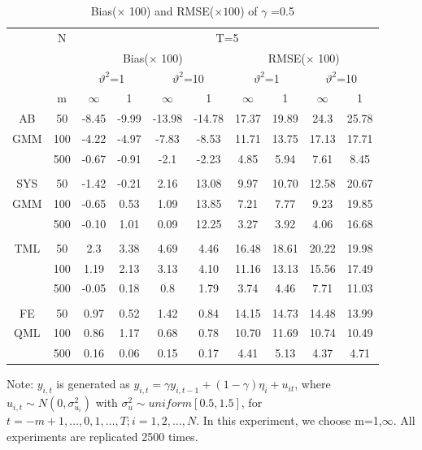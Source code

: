 \documentclass[12pt,a4paper,hyperref]{article}
\begin{document}
\begin{center}
\begin{table}[H]
\caption{Bias($\times$ 100) and RMSE($\times 100$) of $\gamma$ =0.5}  \label{table5}
\centering
\begin{tabular} {*{10}{c}}
\toprule
&N& \multicolumn{8}{c}{T=5}\\
\cmidrule(lr){3-10}
&& \multicolumn{4}{c}{Bias($\times$ 100)} & \multicolumn{4}{c}{RMSE($\times$ 100)}\\
  \cmidrule(lr){3-6} \cmidrule(lr){7-10}
&&  \multicolumn{2}{c}{$\vartheta^{2}$=1}&\multicolumn{2}{c}{$\vartheta^{2}$=10} & \multicolumn{2}{c}{$\vartheta^{2}$=1}&\multicolumn{2}{c}{$\vartheta^{2}$=10}\\
\cmidrule(lr){3-4} \cmidrule(lr){5-6}\cmidrule(lr){7-8}\cmidrule(lr){9-10}
& m & $\infty$ &1&$\infty$ &1&$\infty$ &1&$\infty$&1\\
\cmidrule(lr){3-4} \cmidrule(lr){5-6}\cmidrule(lr){7-8}\cmidrule(lr){9-10}
AB &50&-8.45&-9.99&-13.98&-14.78&17.37&19.89&	24.3&25.78\\
GMM &100&-4.22&-4.97  & -7.83& -8.53& 11.71& 13.75&17.13 &17.71 \\
&500& -0.67&-0.91&-2.1&-2.23&4.85&5.94	&7.61&8.45 \\
\midrule \\
\cmidrule(lr){3-4} \cmidrule(lr){5-6}\cmidrule(lr){7-8}\cmidrule(lr){9-10}
 SYS&50	&-1.42	&-0.21	&2.16&	13.08&9.97&	10.70&12.58&20.67\\
 GMM&100&-0.65&	0.53&1.09&13.85	&7.21&	7.77&9.23&19.85\\
&500&-0.10&	1.01&0.09&12.25&3.27&3.92&4.06&	16.68\\
 \midrule \\
\cmidrule(lr){3-4} \cmidrule(lr){5-6}\cmidrule(lr){7-8}\cmidrule(lr){9-10}
 TML&50&2.3&3.38	&	4.69&	4.46&16.48&18.61&20.22	&19.98 \\
  &100&1.19 & 2.13& 3.13& 4.10&11.16&13.13&15.56 & 17.49\\
 &500&-0.05&0.18&0.8&	1.79&	3.74&4.46&	7.71&11.03 \\
 \midrule \\
\cmidrule(lr){3-4} \cmidrule(lr){5-6}\cmidrule(lr){7-8}\cmidrule(lr){9-10}
 FE &50&0.97&0.52&1.42	&0.84&14.15&14.73&14.48&13.99\\
  QML&100&0.86&	1.17&0.68&0.78&	10.70&	11.69&	10.74&10.49\\
 &500&	0.16&0.06&	0.15&0.17&4.41&5.13	&4.37&4.71\\
\bottomrule
\end{tabular}
\begin{tablenotes}
      \small
      \item Note: $y_{i,t}$ is generated as $y_{i,t}=\gamma y_{i,t-1}+(1-\gamma)\eta_{i}+u_{it}$, where $u_{i,t} \sim N\left(0, \sigma^{2}_{u_{i}} \right)$ with $\sigma^{2}_{u} \sim uniform\left[0.5,1.5 \right]$, for $t=-m+1,\ldots , 0, 1,\ldots, T; i=1,2,\ldots ,N$. In this experiment, we choose m=1,$\infty$.  All experiments are replicated 2500 times.
    \end{tablenotes}
\end{table}
\end{center}
\end{document}
